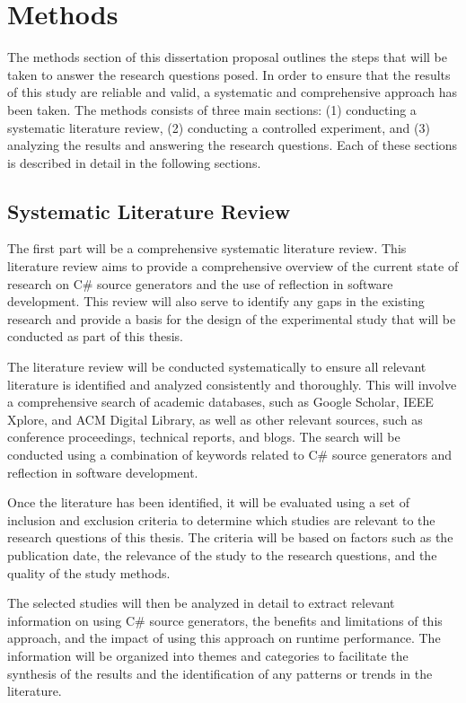\chapter{Methods}

The methods section of this dissertation proposal outlines the steps that will be taken to answer the research questions posed. In order to ensure that the results of this study are reliable and valid, a systematic and comprehensive approach has been taken. The methods consists of three main sections: (1) conducting a systematic literature review, (2) conducting a controlled experiment, and (3) analyzing the results and answering the research questions. Each of these sections is described in detail in the following sections.


\section{Systematic Literature Review}

The first part will be a comprehensive systematic literature review. This literature review aims to provide a comprehensive overview of the current state of research on C\# source generators and the use of reflection in software development. This review will also serve to identify any gaps in the existing research and provide a basis for the design of the experimental study that will be conducted as part of this thesis.

The literature review will be conducted systematically to ensure all relevant literature is identified and analyzed consistently and thoroughly. This will involve a comprehensive search of academic databases, such as Google Scholar, IEEE Xplore, and ACM Digital Library, as well as other relevant sources, such as conference proceedings, technical reports, and blogs. The search will be conducted using a combination of keywords related to C\# source generators and reflection in software development.

Once the literature has been identified, it will be evaluated using a set of inclusion and exclusion criteria to determine which studies are relevant to the research questions of this thesis. The criteria will be based on factors such as the publication date, the relevance of the study to the research questions, and the quality of the study methods.

The selected studies will then be analyzed in detail to extract relevant information on using C\# source generators, the benefits and limitations of this approach, and the impact of using this approach on runtime performance. The information will be organized into themes and categories to facilitate the synthesis of the results and the identification of any patterns or trends in the literature.

